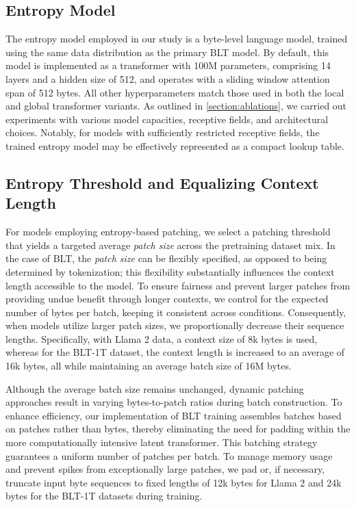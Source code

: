 \subsection{Entropy Model} The entropy model employed in our study is a byte-level language model, trained using the same data distribution as the primary {\textsc BLT} model. By default, this model is implemented as a transformer with 100M parameters, comprising 14 layers and a hidden size of 512, and operates with a sliding window attention span of 512 bytes. All other hyperparameters match those used in both the local and global transformer variants. As outlined in \autoref{section:ablations}, we carried out experiments with various model capacities, receptive fields, and architectural choices. Notably, for models with sufficiently restricted receptive fields, the trained entropy model may be effectively represented as a compact lookup table.

\subsection{Entropy Threshold and Equalizing Context Length} For models employing entropy-based patching, we select a patching threshold that yields a targeted average \textit{patch size} across the pretraining dataset mix. In the case of {\textsc BLT}, the \textit{patch size} can be flexibly specified, as opposed to being determined by tokenization; this flexibility substantially influences the context length accessible to the model. To ensure fairness and prevent larger patches from providing undue benefit through longer contexts, we control for the expected number of bytes per batch, keeping it consistent across conditions. Consequently, when models utilize larger patch sizes, we proportionally decrease their sequence lengths. Specifically, with Llama 2 data, a context size of 8k bytes is used, whereas for the {\textsc BLT}-1T dataset, the context length is increased to an average of 16k bytes, all while maintaining an average batch size of 16M bytes.

Although the average batch size remains unchanged, dynamic patching approaches result in varying bytes-to-patch ratios during batch construction. To enhance efficiency, our implementation of {\textsc BLT} training assembles batches based on patches rather than bytes, thereby eliminating the need for padding within the more computationally intensive latent transformer. This batching strategy guarantees a uniform number of patches per batch. To manage memory usage and prevent spikes from exceptionally large patches, we pad or, if necessary, truncate input byte sequences to fixed lengths of 12k bytes for Llama 2 and 24k bytes for the {\textsc BLT}-1T datasets during training.

